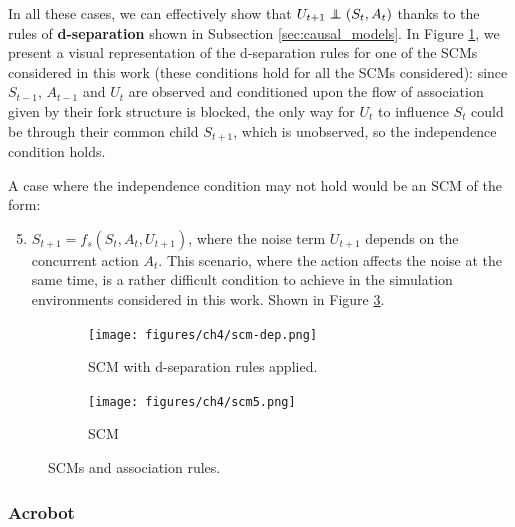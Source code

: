 In all these cases, we can effectively show that
$U_{t+1} \independent (S_t, A_t)$ thanks to the rules
of \textbf{d-separation} shown in Subsection \ref{sec:causal_models}.
In Figure \ref{fig:scm-dep}, we present a visual representation
of the d-separation rules for one of the SCMs considered in this work
(these conditions hold for all the SCMs considered):
since $S_{t-1}$, $A_{t-1}$ and $U_t$ are observed and conditioned upon
the flow of association given by their fork structure is blocked,
the only way for $U_t$ to influence $S_t$ could be
through their common child $S_{t+1}$, which is unobserved,
so the independence condition holds.

A case where the independence condition may not hold would be an
SCM of the form:
\begin{enumerate}
    \setcounter{enumi}{4}
    \item $S_{t+1} = f_s(S_t, A_t, U_{t+1})$,
    where the noise term $U_{t+1}$ depends on the concurrent action
    $A_t$. This scenario, where the action affects the noise at the same time,
    is a rather difficult condition to achieve in the simulation
    environments considered in this work. Shown in Figure \ref{fig:scm5}.
\end{enumerate}
\begin{figure}[h]
    \begin{subfigure}[t]{.41\textwidth}
        \centering
        \texttt{[image: figures/ch4/scm-dep.png]}
        \caption{SCM with d-separation rules applied.}
        \label{fig:scm-dep}
    \end{subfigure}
    \hfill
    \begin{subfigure}[t]{.41\textwidth}
        \centering
        \texttt{[image: figures/ch4/scm5.png]}
        \caption{ SCM}
        \label{fig:scm5}
    \end{subfigure}
    \caption{SCMs and association rules.}
\end{figure}

\subsubsection{Acrobot}

